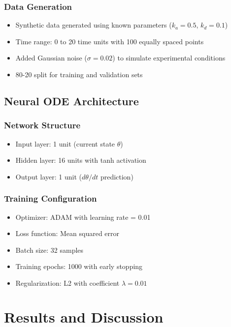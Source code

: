 \documentclass[12pt]{article}
\begin{document}
\subsubsection{Data Generation}
\begin{itemize}
    \item Synthetic data generated using known parameters ($k_a = 0.5$, $k_d = 0.1$)
    \item Time range: 0 to 20 time units with 100 equally spaced points
    \item Added Gaussian noise ($\sigma = 0.02$) to simulate experimental conditions
    \item 80-20 split for training and validation sets
\end{itemize}

\subsection{Neural ODE Architecture}

\subsubsection{Network Structure}
\begin{itemize}
    \item Input layer: 1 unit (current state $\theta$)
    \item Hidden layer: 16 units with tanh activation
    \item Output layer: 1 unit ($d\theta/dt$ prediction)
\end{itemize}

\subsubsection{Training Configuration}
\begin{itemize}
    \item Optimizer: ADAM with learning rate = 0.01
    \item Loss function: Mean squared error
    \item Batch size: 32 samples
    \item Training epochs: 1000 with early stopping
    \item Regularization: L2 with coefficient $\lambda = 0.01$
\end{itemize}

\section{Results and Discussion}
\end{document}

